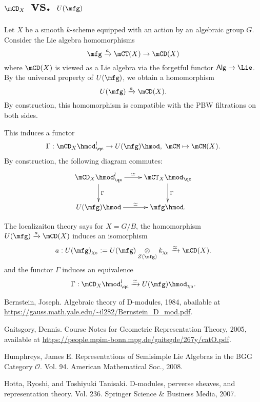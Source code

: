 \section{\texorpdfstring{$\mCD_X$}{DX} vs. \texorpdfstring{$U(\mfg)$}{U(g)}}
	
	\begin{constr}
		Let $X$ be a smooth $k$-scheme equipped with an action by an algebraic group $G$. Consider the Lie algebra homomorphisms
		\[
			\mfg \xrightarrow{a} \mCT(X) \to \mCD(X)
		\]
		where $\mCD(X)$ is viewed as a Lie algebra via the forgetful functor $\mathsf{Alg} \to \Lie$. By the universal property of $U(\mfg)$, we obtain a homomorphism
		\[
			U(\mfg) \xrightarrow{a}  \mCD(X).
		\]
		By construction, this homomorphism is compatible with the PBW filtrations on both sides.

		This induces a functor
		\[
			\Gamma: \mCD_X\hmod^l_\qc \to U(\mfg)\hmod, \; \mCM \mapsto \mCM(X).
		\]
		By construction, the following diagram commutes:
		\[
			\xymatrix{
				\mCD_X\hmod^l_\qc \ar[r]^-\simeq \ar[d]^-\Gamma&
				\mCT_X\hmod_\qc \ar[d]^-\Gamma \\
				U(\mfg)\hmod \ar[r]^-\simeq & \mfg\hmod.
			}
		\]
	\end{constr}

	\begin{rem}
		The localizaiton theory says for $X=G/B$, the homomorphism $U(\mfg) \xrightarrow{a}  \mCD(X)$ induces an isomorphism
		\[
			a: U(\mfg)_{\chi_0}:= U(\mfg)\ot_{Z(\mfg)} k_{\chi_0} \xrightarrow{\simeq}\mCD(X).
		\]
		and the functor $\Gamma$ induces an equivalence
		\[
			\Gamma: \mCD_X\hmod^l_\qc \xrightarrow{\simeq} U(\mfg)\hmod_{\chi_0}.
		\]
	\end{rem}

	
	




\begin{thebibliography}{Yau}

	 Bernstein, Joseph. Algebraic theory of D-modules, 1984, abailable at \url{https://gauss.math.yale.edu/~il282/Bernstein_D_mod.pdf}.

	 Gaitsgory, Dennis. Course Notes for Geometric Representation Theory, 2005, available at \url{https://people.mpim-bonn.mpg.de/gaitsgde/267y/catO.pdf}.

	 Humphreys, James E. Representations of Semisimple Lie Algebras in the BGG Category $\mathcal{O} $. Vol. 94. American Mathematical Soc., 2008.

	 Hotta, Ryoshi, and Toshiyuki Tanisaki. D-modules, perverse sheaves, and representation theory. Vol. 236. Springer Science \& Business Media, 2007.
\end{thebibliography}


 


